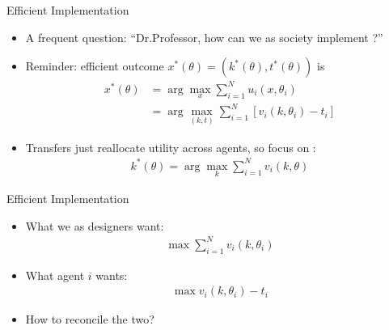 \documentclass[english,10pt
,aspectratio=169
]{beamer}
\begin{document}
\begin{frame}{Efficient Implementation}
\begin{itemize}
	\item A frequent question: ``Dr.Professor, how can we as society implement ?''
	\item Reminder: efficient outcome $x^*(\theta) = (k^*(\theta),t^*(\theta))$ is 
	\vspace{-0.5em}\begin{align*}
	x^*(\theta) &= \arg \max_x \sum_{i=1}^N u_i(x,\theta_i) \\
	&= \arg \max_{(k,t)} \sum_{i=1}^N \left[v_i(k,\theta_i) - t_i\right]
	\end{align*}
	\item Transfers just reallocate utility across agents, so focus on :
	\vspace{-1em}\begin{align*}
	k^*(\theta) = \arg \max_k \sum_{i=1}^N v_i(k,\theta)
	\end{align*}
\end{itemize}
\end{frame}


\begin{frame}{Efficient Implementation}
\begin{itemize}
	\item What we as designers want:
	\vspace{-1em}\begin{align*}
	\max \sum_{i=1}^N v_i(k,\theta_i)
	\end{align*}
	\item What agent $i$ wants:
	\vspace{-1em}\begin{align*}
	\max v_i(k,\theta_i) - t_i
	\end{align*}
	\item How to reconcile the two?
\end{itemize}
\end{frame}
\end{document}
